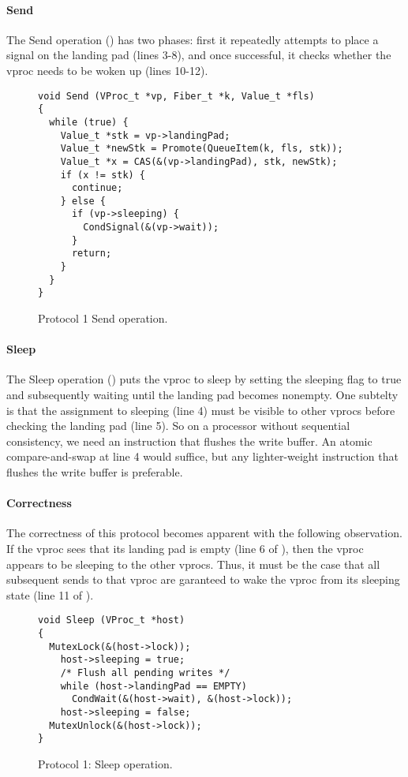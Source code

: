 \documentclass[11pt]{article}
\begin{document}
\paragraph{Send}
The Send operation () has two phases: first it repeatedly attempts to place a
signal on the landing pad (lines 3-8), and once successful, it checks
whether the vproc needs to be woken up (lines 10-12).

\begin{figure}
\lstset{language=C}
\lstset{commentstyle=\textit}
\lstset{numbers=left}
\begin{lstlisting}
void Send (VProc_t *vp, Fiber_t *k, Value_t *fls)
{
  while (true) {
    Value_t *stk = vp->landingPad;
    Value_t *newStk = Promote(QueueItem(k, fls, stk));
    Value_t *x = CAS(&(vp->landingPad), stk, newStk);
    if (x != stk) {
      continue;
    } else {
      if (vp->sleeping) {
        CondSignal(&(vp->wait));
      }
      return;
    }
  }
}
\end{lstlisting}
\caption{Protocol 1 Send operation.}\label{fig:protocol1-send}
\end{figure}

\paragraph{Sleep}
The Sleep operation () puts the vproc to sleep by 
setting the sleeping flag to true and subsequently waiting until the landing
pad becomes nonempty.
One subtelty is that the assignment to sleeping (line 4) must be visible
to other vprocs before checking the landing pad (line 5).
So on a processor without sequential consistency, we need an instruction that flushes 
the write buffer.
An atomic compare-and-swap at line 4 would suffice, but any lighter-weight instruction
that flushes the write buffer is preferable.

\paragraph{Correctness}
The correctness of this protocol becomes apparent with the following observation.
If the vproc sees that its landing pad is empty (line 6 of ), 
then the vproc appears to be sleeping to the other vprocs.
Thus, it must be the case that all subsequent sends to that vproc are garanteed to
wake the vproc from its sleeping state (line 11 of ).

\begin{figure}
\lstset{language=C}
\lstset{commentstyle=\textit}
\lstset{numbers=left}
\begin{lstlisting}
void Sleep (VProc_t *host)
{
  MutexLock(&(host->lock));
    host->sleeping = true;
    /* Flush all pending writes */
    while (host->landingPad == EMPTY)
      CondWait(&(host->wait), &(host->lock));
    host->sleeping = false;
  MutexUnlock(&(host->lock));
}
\end{lstlisting}
\caption{Protocol 1: Sleep operation.}\label{fig:protocol1-sleep}
\end{figure}
\end{document}
